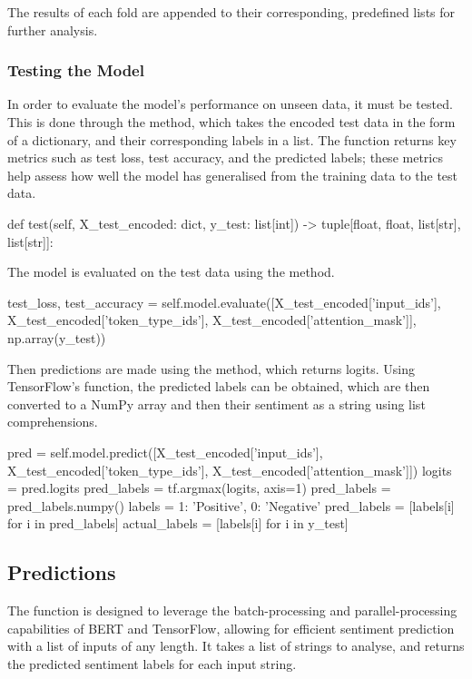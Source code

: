         The results of each fold are appended to their corresponding, predefined lists for further analysis.

        \subsubsection{Testing the Model}
        In order to evaluate the model's performance on unseen data, it must be tested. This is done through the  method, which takes the encoded test data in the form of a dictionary, and their corresponding labels in a list. The function returns key metrics such as test loss, test accuracy, and the predicted labels; these metrics help assess how well the model has generalised from the training data to the test data.

        \begin{python}
def test(self, X_test_encoded: dict, y_test: list[int]) -> tuple[float, float, list[str], list[str]]:
        \end{python}

        The model is evaluated on the test data using the  method.

        \begin{python}
test_loss, test_accuracy = self.model.evaluate([X_test_encoded['input_ids'], X_test_encoded['token_type_ids'], X_test_encoded['attention_mask']], np.array(y_test))
        \end{python}

        Then predictions are made using the  method, which returns logits. Using TensorFlow's  function, the predicted labels can be obtained, which are then converted to a NumPy array and then their sentiment as a string using list comprehensions.

        \begin{python}
pred = self.model.predict([X_test_encoded['input_ids'], X_test_encoded['token_type_ids'], X_test_encoded['attention_mask']])
logits = pred.logits
pred_labels = tf.argmax(logits, axis=1)
pred_labels = pred_labels.numpy()
labels = {1: 'Positive', 0: 'Negative'}
pred_labels = [labels[i] for i in pred_labels]
actual_labels = [labels[i] for i in y_test]
        \end{python}

    \subsection{Predictions}
    The  function is designed to leverage the batch-processing and parallel-processing capabilities of BERT and TensorFlow, allowing for efficient sentiment prediction with a list of inputs of any length. It takes a list of strings to analyse, and returns the predicted sentiment labels for each input string.

